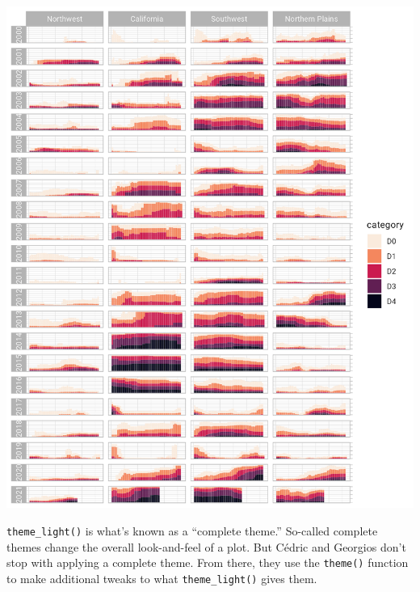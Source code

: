 \documentclass[
]{book}
\begin{document}
\includegraphics[width=1\linewidth]{data-viz_files/figure-latex/unnamed-chunk-36-1}

\texttt{theme\_light()} is what's known as a ``complete theme.'' So-called complete themes change the overall look-and-feel of a plot. But Cédric and Georgios don't stop with applying a complete theme. From there, they use the \texttt{theme()} function to make additional tweaks to what \texttt{theme\_light()} gives them.
\end{document}
